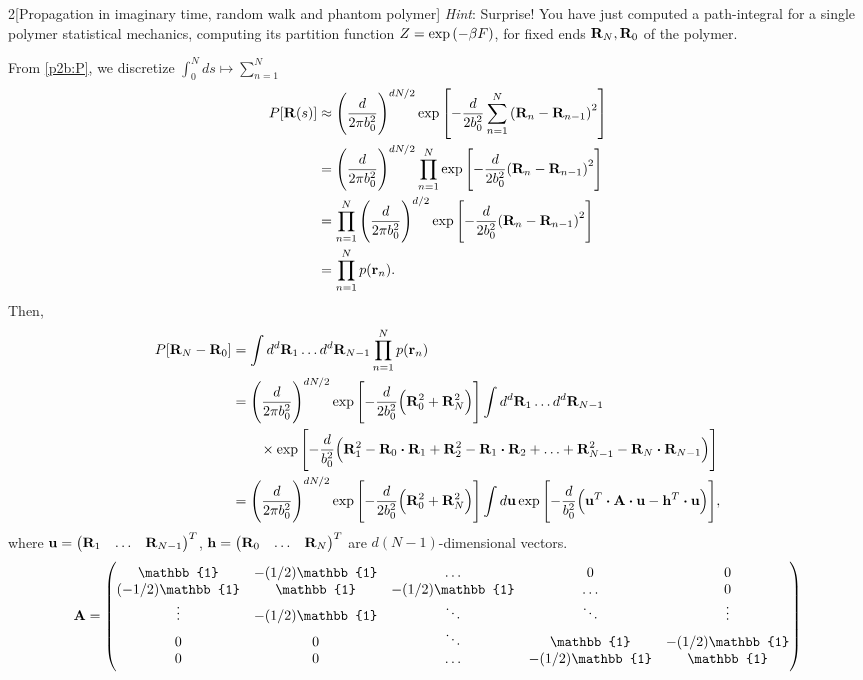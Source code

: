 \documentclass[12pt]{article}
\begin{document}
\begin{problem}{2}[Propagation in imaginary time, random walk and phantom
    polymer]
\textit{Hint}: Surprise! You have just computed a path-integral for a single
polymer statistical mechanics, computing its partition function
$Z=\exp\qty(-\beta F)$, for fixed ends $\vb{R}_N,\vb{R}_0$ of the polymer.
\begin{solution}
From \eqref{p2b:P}, we discretize $\int_0^Nds\mapsto\sum_{n=1}^N$
\begin{align}
    P[\vb{R}(s)]
    &\approx\qty(\frac{d}{2\pi b_0^2})^{dN/2}
    \exp\qty[-\frac{d}{2b_0^2}\sum_{n=1}^N\qty(\vb{R}_n-\vb{R}_{n-1})^2]\notag\\
    &=\qty(\frac{d}{2\pi b_0^2})^{dN/2}
    \prod_{n=1}^N\exp\qty[-\frac{d}{2b_0^2}\qty(\vb{R}_n-\vb{R}_{n-1})^2]\notag\\
    &=\prod_{n=1}^N\qty(\frac{d}{2\pi b_0^2})^{d/2}
    \exp\qty[-\frac{d}{2b_0^2}\qty(\vb{R}_n-\vb{R}_{n-1})^2]\notag\\
    &=\prod_{n=1}^Np(\vb{r}_n).
\end{align}
Then,
\begin{align}
    P\qty[\vb{R}_N-\vb{R}_0]
    &=\int d^d\vb{R}_1\hdots d^d\vb{R}_{N-1}\prod_{n=1}^Np(\vb{r}_n)\notag\\
    &=\qty(\frac{d}{2\pi b_0^2})^{dN/2}
    \exp\qty[-\frac{d}{2b_0^2}\qty(\vb{R}_0^2+\vb{R}_N^2)]
    \int d^d\vb{R}_1\hdots d^d\vb{R}_{N-1}\notag\\
    &\qquad\times
    \exp\qty[-\frac{d}{b_0^2}\qty(\vb{R}_1^2-\vb{R}_0\vdot\vb{R}_1
        +\vb{R}_2^2-\vb{R}_1\vdot\vb{R}_2+\hdots
        +\vb{R}_{N-1}^2-\vb{R}_{N}\vdot\vb{R}_{N-1})]\notag\\
    &=\qty(\frac{d}{2\pi b_0^2})^{dN/2}
        \exp\qty[-\frac{d}{2b_0^2}\qty(\vb{R}_0^2+\vb{R}_N^2)]
        \int d\vb{u}\exp\qty[-\frac{d}{b_0^2}
        \qty(\vb{u}^T\vdot\vb{A}\vdot\vb{u}-\vb{h}^T\vdot\vb{u})],
\end{align}
where $\vb{u}=\mqty(\vb{R}_1&\hdots&\vb{R}_{N-1})^T$,
$\vb{h}=\mqty(\vb{R}_0&\hdots&\vb{R}_N)^T$ are $d(N-1)$-dimensional vectors.
\begin{equation}
    \vb{A}
    =\mqty(
        \mathbb{1} & -(1/2)\mathbb{1} & \hdots & 0 & 0\\
        (-1/2)\mathbb{1} & \mathbb{1} & -(1/2)\mathbb{1} & \hdots & 0\\
        \vdots  &   -(1/2)\mathbb{1}  &   \ddots  &   \ddots  &   \vdots\\
        0 & 0 & \ddots & \mathbb{1} & -(1/2)\mathbb{1}\\
        0 & 0 & \hdots & -(1/2)\mathbb{1} & \mathbb{1}
    )
\end{equation}

\end{solution}
\end{problem}
\end{document}
